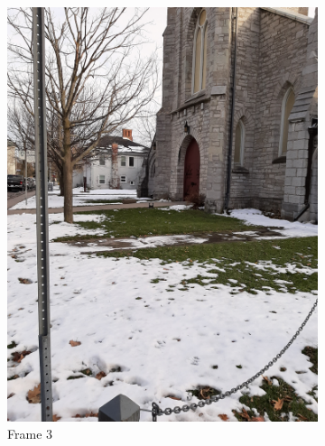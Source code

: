 \documentclass[conference]{IEEEtran}
\begin{document}
\begin{figure}[!h]
\begin{subfigure}[b]{0.2\linewidth}
    \includegraphics[width=\linewidth, angle = -90]{images/frame3.jpg}
    \caption{Frame 3}
  \end{subfigure}
  \begin{subfigure}[b]{0.2\linewidth}

\end{subfigure}
\end{figure}
\end{document}
